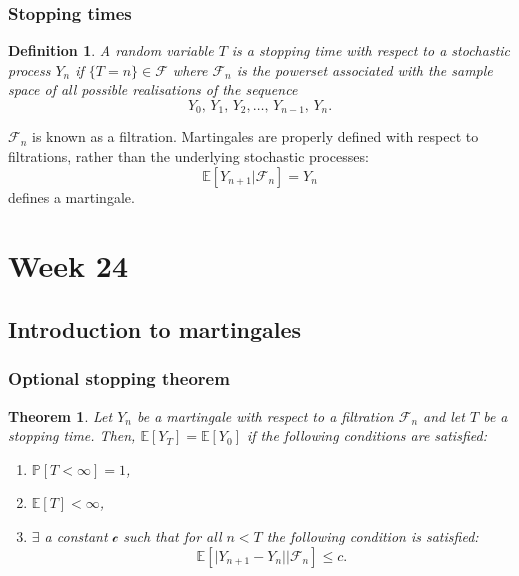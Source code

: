 \documentclass{article}
\newtheorem{theorem}{Theorem}
\newtheorem{definition}{Definition}
\newcommand{\Prob}{\mathbb{P}}
\newcommand{\E}{\mathbb{E}}
\begin{document}
\subsubsection{Stopping times}
\begin{definition}
    A random variable $T$ is a stopping time with respect to a stochastic process $Y_n$ if $\{ T=n \}\in \mathcal{F}$ where $\mathcal{F}_n$ is the powerset associated with the sample space of all possible realisations of the sequence
    \begin{equation}
        Y_0,\,Y_1,\,Y_2,\ldots,\,Y_{n-1},\,Y_n. \nonumber
    \end{equation}
\end{definition}
$\mathcal{F}_n$ is known as a filtration. Martingales are properly defined with respect to filtrations, rather than the underlying stochastic processes:
\begin{equation}
    \E[Y_{n+1}\vert \mathcal{F}_n] = Y_n
\end{equation}
defines a martingale. 

\section{Week 24}
\subsection{Introduction to martingales}
\subsubsection{Optional stopping theorem}
\begin{theorem}
    Let $Y_n$ be a martingale with respect to a filtration $\mathcal{F}_n$ and let $T$ be a stopping time. Then, $\E[Y_T] = \E[Y_0]$ if the following conditions are satisfied:
    \begin{enumerate}
        \item $\Prob[T<\infty] = 1$,
        \item $\E[T]<\infty$,
        \item $\exists$ a constant $\mathcal{c}$ such that for all $n<T$ the following condition is satisfied:
        \begin{equation}
            \E\left[\vert Y_{n+1}-Y_n \vert \biggr\rvert \mathcal{F}_n \right]\leq c.
        \end{equation}
    \end{enumerate}
\end{theorem}
\end{document}
